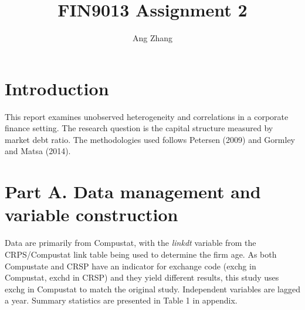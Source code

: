 \documentclass{article}
\title{FIN9013 Assignment 2}
\author{Ang Zhang}
\begin{document}
\maketitle

\singlespacing

\section*{Introduction}
This report examines unobserved heterogeneity and correlations in a corporate finance setting. The research question is the capital structure measured by market debt ratio. The methodologies used follows Petersen (2009) and Gormley and Matsa (2014).

\section*{Part A. Data management and variable construction}
Data are primarily from Compustat, with the \textit{linkdt} variable from the CRPS/Compustat link table being used to determine the firm age. As both Compustate and CRSP have an indicator for exchange code (exchg in Compustat, exchd in CRSP) and they yield different results, this study uses exchg in Compustat to match the original study. Independent variables are lagged a year. Summary statistics are presented in Table 1 in appendix.
\end{document}
